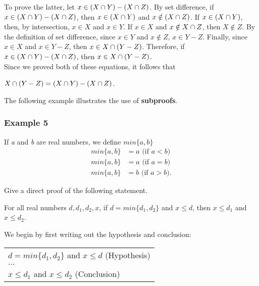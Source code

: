 To prove the latter, let $x \in (X \cap Y) - (X \cap Z)$.  By set difference, if $x \in (X \cap Y) - (X \cap Z)$, then $x \in (X \cap Y)$ and $x \notin (X \cap Z)$.  If $x \in (X \cap Y)$, then, by intersection, $x \in X$ and $x \in Y$.  If $x \in X$ and $x \notin X \cap Z$, then $X \notin Z$.  By the definition of set difference, since $x \in Y$ and $x \notin Z$, $x \in Y - Z$.  Finally, since $x \in X$ and $x \in Y - Z$, then $x \in X \cap (Y - Z)$.  Therefore, if $x \in (X \cap Y) - (X \cap Z)$, then $x \in X \cap (Y - Z)$.\\

Since we proved both of these equations, it follows that

\begin{center}
    $X \cap (Y - Z) = (X \cap Y) - (X \cap Z)$.
\end{center}

The following example illustrates the use of \textbf{subproofs}.

\subsubsection*{Example 5}

If \textit{a} and \textit{b} are real numbers, we define $min\{a, b\}$
\begin{align*}
    min\{a, b\} &= a \text{ (if $a < b$)}\\
    min\{a, b\} &= a \text{ (if $a = b$)}\\
    min\{a, b\} &= b \text{ (if $a > b$)}.
\end{align*}

Give a direct proof of the following statement.
\begin{center}
    For all real numbers $d, d_1, d_2, x$, if $d = min\{d_1, d_2\}$ and $x \leq d$, then $x \leq d_1$ and $x \leq d_2$.
\end{center}

We begin by first writing out the hypothesis and conclusion:

\begin{table}[h]
\centering
\begin{tabular}{l}
$d = min\{d_1, d_2\}$ and $x \leq d$ (Hypothesis)\\
$\dots$\\
$x \leq d_1$ and $x \leq d_2$ (Conclusion)
\end{tabular}
\end{table}

